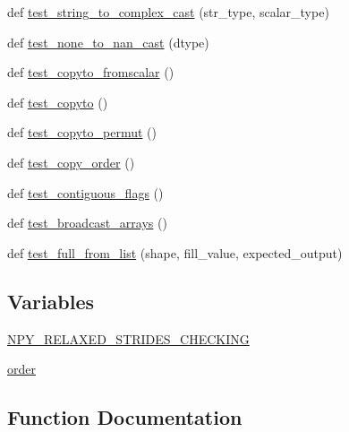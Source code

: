\begin{DoxyCompactItemize}
\item 
def \hyperlink{namespacenumpy_1_1core_1_1tests_1_1test__api_ad834d42b9c791b4bc5f5deeff5089e8e}{test\+\_\+string\+\_\+to\+\_\+complex\+\_\+cast} (str\+\_\+type, scalar\+\_\+type)
\item 
def \hyperlink{namespacenumpy_1_1core_1_1tests_1_1test__api_ac08d6b7f96d753b88cdc207e69deb7e8}{test\+\_\+none\+\_\+to\+\_\+nan\+\_\+cast} (dtype)
\item 
def \hyperlink{namespacenumpy_1_1core_1_1tests_1_1test__api_a98c39c703e6b1622a3e3401598f83d4c}{test\+\_\+copyto\+\_\+fromscalar} ()
\item 
def \hyperlink{namespacenumpy_1_1core_1_1tests_1_1test__api_acde30ee42b0718ddf614e0a2615c0492}{test\+\_\+copyto} ()
\item 
def \hyperlink{namespacenumpy_1_1core_1_1tests_1_1test__api_acb3f95059b01a4542d5bd90ba6d47995}{test\+\_\+copyto\+\_\+permut} ()
\item 
def \hyperlink{namespacenumpy_1_1core_1_1tests_1_1test__api_a65cda21c641072cce2c0c0b6a9d874e8}{test\+\_\+copy\+\_\+order} ()
\item 
def \hyperlink{namespacenumpy_1_1core_1_1tests_1_1test__api_ad9ed79bf0fb320db020ec6afff4a03bc}{test\+\_\+contiguous\+\_\+flags} ()
\item 
def \hyperlink{namespacenumpy_1_1core_1_1tests_1_1test__api_a563c4f69b13a69eb91260d3cba94c19c}{test\+\_\+broadcast\+\_\+arrays} ()
\item 
def \hyperlink{namespacenumpy_1_1core_1_1tests_1_1test__api_a1241936dc3bc994f915fa2d8ecc4124e}{test\+\_\+full\+\_\+from\+\_\+list} (shape, fill\+\_\+value, expected\+\_\+output)
\end{DoxyCompactItemize}
\subsection*{Variables}
\begin{DoxyCompactItemize}
\item 
\hyperlink{namespacenumpy_1_1core_1_1tests_1_1test__api_aefe47ff34569b616978a22ef5bf9893c}{N\+P\+Y\+\_\+\+R\+E\+L\+A\+X\+E\+D\+\_\+\+S\+T\+R\+I\+D\+E\+S\+\_\+\+C\+H\+E\+C\+K\+I\+NG}
\item 
\hyperlink{namespacenumpy_1_1core_1_1tests_1_1test__api_a91c12766f9c4b4fd981a86a585db36bc}{order}
\end{DoxyCompactItemize}


\subsection{Function Documentation}
\mbox{\label{namespacenumpy_1_1core_1_1tests_1_1test__api_a3e0c912b4887f9acbb048700ca9f8e89}} 
